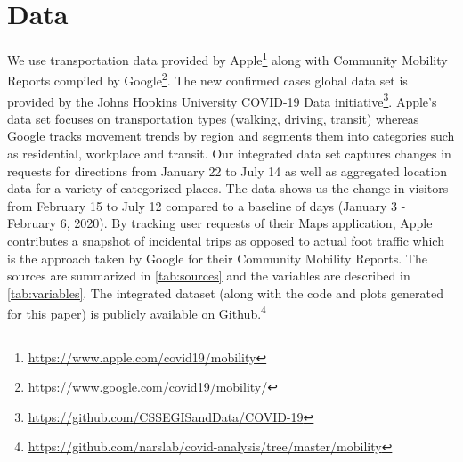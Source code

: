 \documentclass[titlepage,oneside,12pt]{article}
\newcommand{\trbcite}[1]{({\it \citenum{#1}})}
\newcommand{\?}{\stackrel{?}{=}}
\begin{document}




\section{Data}
We use transportation data provided by Apple\footnote{\url{https://www.apple.com/covid19/mobility}} along with Community Mobility Reports compiled by Google\footnote{\url{https://www.google.com/covid19/mobility/}}. %
The new confirmed cases global data set is provided by the Johns Hopkins University COVID-19 Data initiative\footnote{\url{https://github.com/CSSEGISandData/COVID-19}}.
Apple's data set focuses on transportation types (walking, driving, transit) whereas Google tracks movement trends by region and segments them into categories such as residential, workplace and transit. Our integrated data set captures changes in requests for directions from January 22 to July 14 as well as aggregated location data for a variety of categorized places. The data shows us the change in visitors from February 15 to July 12 compared to a baseline of days (January 3 - February 6, 2020). By tracking user requests of their Maps application, Apple contributes a snapshot of incidental trips as opposed to actual foot traffic which is the approach taken by Google for their Community Mobility Reports. 
The sources are summarized in \autoref{tab:sources} and the variables are described in \autoref{tab:variables}.
The integrated dataset (along with the code and plots generated for this paper) is publicly available on Github.\footnote{\url{https://github.com/narslab/covid-analysis/tree/master/mobility}}
\end{document}
